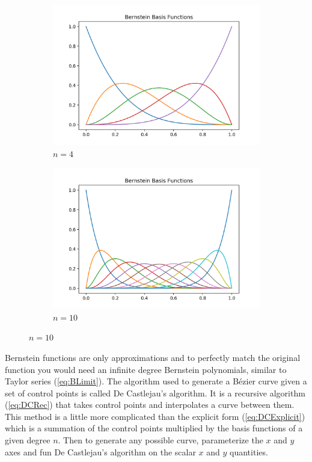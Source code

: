 \documentclass[12pt, letterpaper]{article}
\begin{document}
\begin{figure}[ht]
  \begin{center}
    \begin{subfigure}[b]{.45\linewidth}
      \includegraphics[width=\linewidth]{Basis/basis4}
      \caption{$n=4$}
    \end{subfigure}
    \begin{subfigure}[b]{.45\linewidth}
      \includegraphics[width=\linewidth]{Basis/basis10}
      \caption{$n=10$}
    \end{subfigure}
  \end{center}
\end{figure}

Bernstein functions are only approximations and to perfectly match the original function you would need an 
infinite degree Bernstein polynomials, similar to Taylor series (\ref{eq:BLimit}). The algorithm used to
generate a B\'ezier curve given a set of control points is called De Castlejau's algorithm. It is a recursive
algorithm (\ref{eq:DCRec}) that takes control points and interpolates a curve between them. This method is a
little more complicated than the explicit form (\ref{eq:DCExplicit}) which is a summation of the control
points multiplied by the basis functions of a given degree $n$. Then to generate any possible curve, 
parameterize the $x$ and $y$ axes and fun De Castlejau's algorithm on the scalar $x$ and $y$ quantities. 
\end{document}
